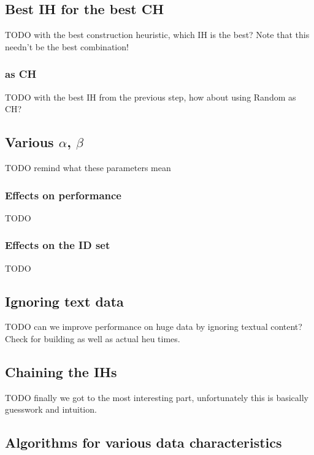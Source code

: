 \subsection{Best IH for the best CH}

TODO with the best construction heuristic, which IH is the best? Note that this needn't be the best combination!

\subsubsection{ as CH}

TODO with the best IH from the previous step, how about using Random as CH?

\subsection{Various $\alpha$, $\beta$}

TODO remind what these parameters mean

\subsubsection{Effects on performance}

TODO

\subsubsection{Effects on the ID set}

TODO

\subsection{Ignoring text data}

TODO can we improve performance on huge data by ignoring textual content? Check for building as well as actual heu times.

\subsection{Chaining the IHs}

TODO finally we got to the most interesting part, unfortunately this is basically guesswork and intuition.

\subsection{Algorithms for various data characteristics}

